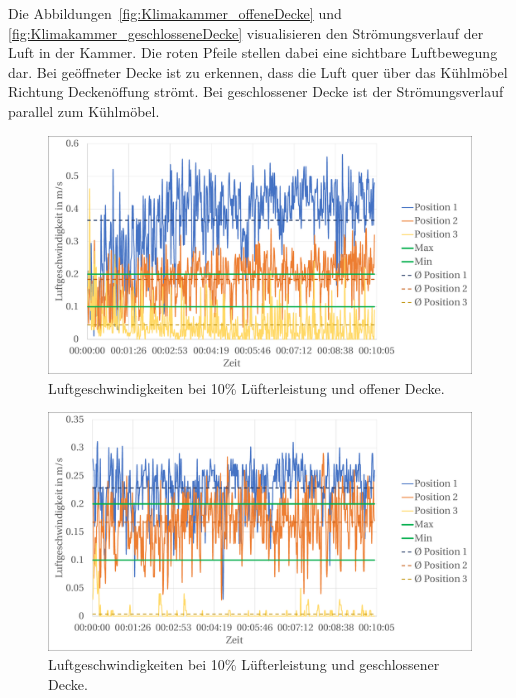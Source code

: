 Die Abbildungen~\ref{fig:Klimakammer_offeneDecke} und \ref{fig:Klimakammer_geschlosseneDecke} visualisieren den Strömungsverlauf der Luft in der Kammer. Die roten Pfeile stellen dabei eine sichtbare Luftbewegung dar.
Bei geöffneter Decke ist zu erkennen, dass die Luft quer über das Kühlmöbel Richtung Deckenöffung strömt.
Bei geschlossener Decke ist der Strömungsverlauf parallel zum Kühlmöbel.




\begin{figure}[h!tb]
\centering
\includegraphics[scale=.45]{Pictures/10pctOC.pdf}
\caption{Luftgeschwindigkeiten bei 10\% Lüfterleistung und offener Decke.}
\label{fig:10pctOC}
\end{figure}


\begin{figure}[h!tb]
\centering
\includegraphics[scale=.45]{Pictures/10pctCC.pdf}
\caption{Luftgeschwindigkeiten bei 10\% Lüfterleistung und geschlossener Decke.}
\label{fig:10pctCC}
\end{figure}


